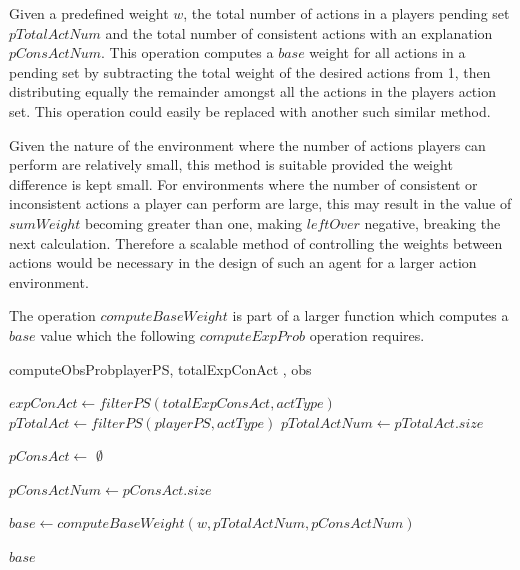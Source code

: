 \documentclass[parskip]{cs4rep}
\begin{document}
Given a predefined weight $w$, the total number of actions in a players pending set $pTotalActNum$ and the total number of consistent actions with an explanation $pConsActNum$. This operation computes a $base$ weight for all actions in a pending set by subtracting the total weight of the desired actions from 1, then distributing equally the remainder amongst all the actions in the players action set. This operation could easily be replaced with another such similar method.

Given the nature of the environment where the number of actions players can perform are relatively small, this method is suitable provided the weight difference is kept small. For environments where the number of consistent or inconsistent actions a player can perform are large, this may result in the value of $sumWeight$ becoming greater than one, making $leftOver$ negative, breaking the next calculation. Therefore a scalable method of controlling the weights between actions would be necessary in the design of such an agent for a larger action environment.

The operation $computeBaseWeight$ is part of a larger function which computes a $base$ value which the following $computeExpProb$ operation requires.

\begin{pseudocode}[ruled]{computeObsProb}{playerPS, totalExpConAct , obs}
\begin{algorithm}[H]
$expConAct \gets filterPS(totalExpConsAct, actType)$ \newline
$pTotalAct \gets filterPS(playerPS, actType)$\newline
$pTotalActNum \gets pTotalAct.size$ \newline

$pConsAct \gets $ $\emptyset$ \newline


$pConsActNum \gets pConsAct.size$\newline

$base \gets computeBaseWeight(w, pTotalActNum, pConsActNum)$\newline 

\Return $base$

\end{algorithm}
\end{pseudocode}
\end{document}
